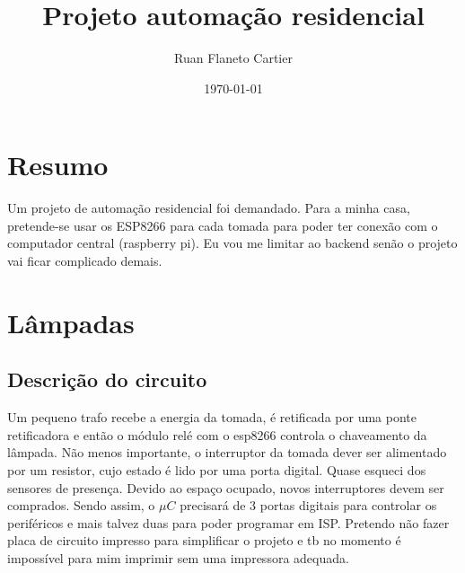 \documentclass[11pt]{article}
\author{Ruan Flaneto Cartier}
\date{\today}
\title{Projeto automação residencial}
\begin{document}
\maketitle
\tableofcontents


\section{Resumo}
\label{sec:orgb775871}
Um projeto de automação residencial foi demandado. Para a minha casa, pretende-se usar os ESP8266 para cada tomada para poder ter conexão com o computador central (raspberry pi).
Eu vou me limitar ao backend senão o projeto vai ficar complicado demais.

\section{Lâmpadas}
\label{sec:org6092d4b}
\subsection{Descrição do circuito}
\label{sec:org9361b58}
Um pequeno trafo recebe a energia da tomada, é retificada por uma ponte retificadora e então o módulo relé com o esp8266 controla o chaveamento da lâmpada. Não menos importante, o interruptor da tomada dever ser alimentado por um resistor, cujo estado é lido por uma porta digital. Quase esqueci dos sensores de presença. Devido ao espaço ocupado, novos interruptores devem ser comprados.
Sendo assim, o \(\mu C\) precisará de 3 portas digitais para controlar os periféricos e mais talvez duas para poder programar em ISP.
Pretendo não fazer placa de circuito impresso para simplificar o projeto e tb no momento é impossível para mim imprimir sem uma impressora adequada.
\end{document}
